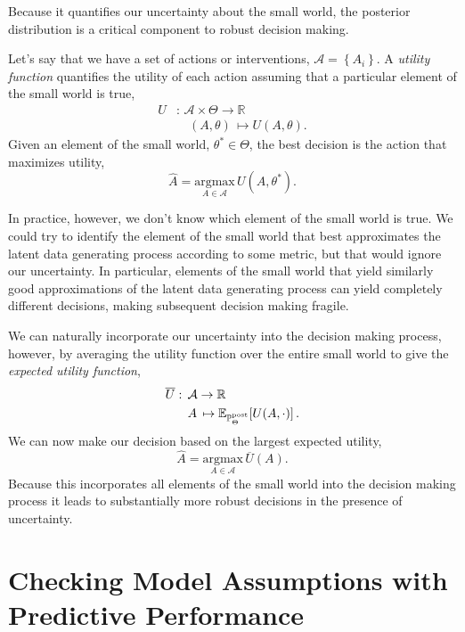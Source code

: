 Because it quantifies our uncertainty about the small world,
the posterior distribution is a critical component to robust
decision making.

Let's say that we have a set of actions or interventions, 
$\mathcal{A} = \left\{ A_{i} \right\}$.  A \emph{utility function}
quantifies the utility of each action assuming that a particular
element of the small world is true,
%
\begin{align*}
U &: \,\mathcal{A} \times \Theta \rightarrow \mathbb{R}
\\
& \quad \left(A, \theta \right) \, \mapsto U(A, \theta).
\end{align*}
%
Given an element of the small world, $\theta^{*} \in \Theta$,
the best decision is the action that maximizes utility,
%
\begin{equation*}
\hat{A} = \underset{A \in \mathcal{A}}{\mathrm{argmax}} \,
U \! \left( A, \theta^{*} \right).
\end{equation*}

In practice, however, we don't know which element of the
small world is true.  We could try to identify the element of
the small world that best approximates the latent data generating 
process according to some metric, but that would ignore our 
uncertainty.  In particular, elements of the small world that 
yield similarly good approximations of the latent data generating
process can yield completely different decisions, making
subsequent decision making fragile.

We can naturally incorporate our uncertainty into the decision
making process, however, by averaging the utility function over
the entire small world to give the \emph{expected
utility function},
%
\begin{align*}
\overline{U} &: \,\mathcal{A} \rightarrow \mathbb{R}
\\
& \quad A \, \mapsto 
\mathbb{E}_{\mathbb{P}^{\mathrm{post}}_{\Theta}} \! \left[ U(A, \cdot) \right].
\end{align*}
%
We can now make our decision based on the largest expected
utility,
%
\begin{equation*}
\hat{A} = \underset{A \in \mathcal{A}}{\mathrm{argmax}} \,
\overline{U} \! \left( A \right).
\end{equation*}
%
Because this incorporates all elements of the small world into
the decision making process it leads to substantially more
robust decisions in the presence of uncertainty.

\section{Checking Model Assumptions with Predictive Performance}

